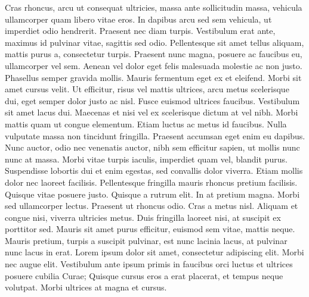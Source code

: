 \documentclass[twoside]{scrartcl}
\begin{document}
\autoversenumber Cras rhoncus, arcu ut consequat ultricies, massa ante sollicitudin massa, vehicula ullamcorper quam libero vitae eros.
\autoversenumber In dapibus arcu sed sem vehicula, ut imperdiet odio hendrerit.
\autoversenumber Praesent nec diam turpis.
\autoversenumber Vestibulum erat ante, maximus id pulvinar vitae, sagittis sed odio.
\autoversenumber Pellentesque sit amet tellus aliquam, mattis purus a, consectetur turpis.
\autoversenumber Praesent nunc magna, posuere ac faucibus eu, ullamcorper vel sem.
\autoversenumber Aenean vel dolor eget felis malesuada molestie ac non justo.
\autoversenumber Phasellus semper gravida mollis.
\autoversenumber Mauris fermentum eget ex et eleifend.
\autoversenumber Morbi sit amet cursus velit.
\autoversenumber Ut efficitur, risus vel mattis ultrices, arcu metus scelerisque dui, eget semper dolor justo ac nisl.
\autoversenumber Fusce euismod ultrices faucibus.
\autoversenumber Vestibulum sit amet lacus dui.
\autoversenumber Maecenas et nisi vel ex scelerisque dictum at vel nibh.
\autoversenumber Morbi mattis quam ut congue elementum.
\autoversenumber Etiam luctus ac metus id faucibus.
\autoversenumber Nulla vulputate massa non tincidunt fringilla.
\autoversenumber Praesent accumsan eget enim eu dapibus.
\autoversenumber Nunc auctor, odio nec venenatis auctor, nibh sem efficitur sapien, ut mollis nunc nunc at massa.
\autoversenumber Morbi vitae turpis iaculis, imperdiet quam vel, blandit purus.
\autoversenumber Suspendisse lobortis dui et enim egestas, sed convallis dolor viverra.
\autoversenumber Etiam mollis dolor nec laoreet facilisis.
\autoversenumber Pellentesque fringilla mauris rhoncus pretium facilisis.
\autoversenumber Quisque vitae posuere justo.
\autoversenumber Quisque a rutrum elit.
\autoversenumber In at pretium magna.
\autoversenumber Morbi sed ullamcorper lectus.
\autoversenumber Praesent ut rhoncus odio.
\autoversenumber Cras a metus nisl.
\autoversenumber Aliquam et congue nisi, viverra ultricies metus.
\autoversenumber Duis fringilla laoreet nisi, at suscipit ex porttitor sed.
\autoversenumber Mauris sit amet purus efficitur, euismod sem vitae, mattis neque.
\autoversenumber Mauris pretium, turpis a suscipit pulvinar, est nunc lacinia lacus, at pulvinar nunc lacus in erat.
\autoversenumber Lorem ipsum dolor sit amet, consectetur adipiscing elit.
\autoversenumber Morbi nec augue elit.
\autoversenumber Vestibulum ante ipsum primis in faucibus orci luctus et ultrices posuere cubilia Curae; Quisque cursus eros a erat placerat, et tempus neque volutpat.
\autoversenumber Morbi ultrices at magna et cursus.
\end{document}
